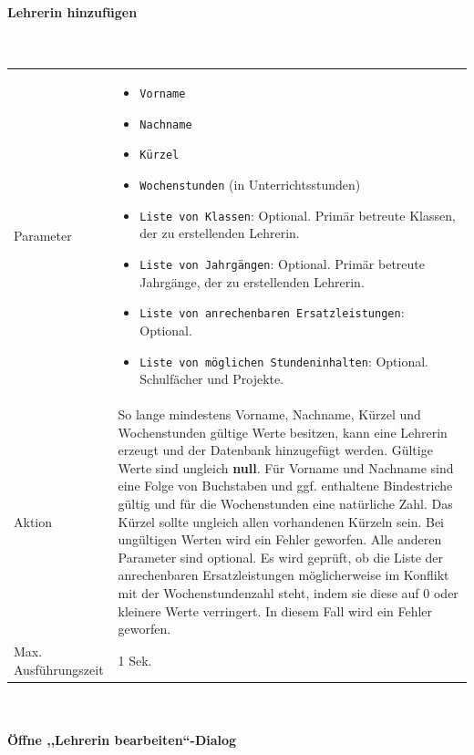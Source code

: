 \documentclass[fontsize=12pt,paper=a4,twoside]{scrartcl}
\begin{document}
\clearpage
\paragraph{Lehrerin hinzufügen}\mbox{}\\

\hypertarget{par:LehrerinHinzufuegen}{
\begin{tabularx}{\textwidth}{p{4cm}X}
Parameter & \begin{itemize}[itemsep=0pt, leftmargin = 0.5cm]
			\item \texttt{Vorname}
			\item \texttt{Nachname}
			\item \texttt{Kürzel}
			\item \texttt{Wochenstunden} (in Unterrichtsstunden)
			\item \texttt{Liste von Klassen}: Optional. Primär betreute Klassen, der zu erstellenden Lehrerin.
			\item \texttt{Liste von Jahrgängen}: Optional. Primär betreute Jahrgänge, der zu erstellenden Lehrerin.
			\item \texttt{Liste von anrechenbaren Ersatzleistungen}: Optional.
			\item \texttt{Liste von möglichen Stundeninhalten}: Optional. Schulfächer und Projekte.
			\end{itemize}\\
Aktion &  So lange mindestens Vorname, Nachname, Kürzel und Wochenstunden gültige Werte besitzen, kann eine Lehrerin erzeugt und der Datenbank hinzugefügt werden. Gültige Werte sind ungleich \textbf{null}. Für Vorname und Nachname sind eine Folge von Buchstaben und ggf. enthaltene Bindestriche gültig und für die Wochenstunden eine natürliche Zahl. Das Kürzel sollte ungleich allen vorhandenen Kürzeln sein.  Bei ungültigen Werten wird ein Fehler geworfen. Alle anderen Parameter sind optional. Es wird geprüft, ob die Liste der anrechenbaren Ersatzleistungen möglicherweise im Konflikt mit der Wochenstundenzahl steht, indem sie diese auf 0 oder kleinere Werte verringert. In diesem Fall wird ein Fehler geworfen.  \\
Max. Ausführungszeit & 1 Sek. 
\end{tabularx}}\\


\paragraph{Öffne ,,Lehrerin bearbeiten``-Dialog}\mbox{}\\
\end{document}
